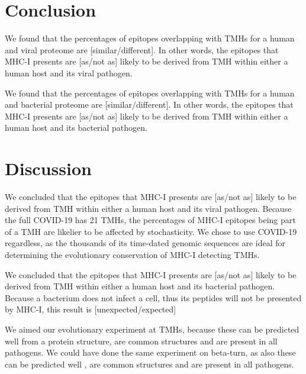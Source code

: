 \section{Conclusion}

We found that the percentages of epitopes overlapping 
with TMHs for a human and viral proteome are 
[similar/different]. In other words, the
epitopes that MHC-I presents are [as/not as] likely 
to be derived from TMH within either a human host and its viral pathogen.

We found that the percentages of epitopes overlapping 
with TMHs for a human and bacterial proteome are 
[similar/different]. In other words, the
epitopes that MHC-I presents are [as/not as] likely 
to be derived from TMH within either a human host and its bacterial pathogen.

\section{Discussion}

We concluded that the
epitopes that MHC-I presents are [as/not as] likely 
to be derived from TMH within either a human host and its viral pathogen.
Because the full COVID-19 has 21 TMHs, the percentages
of MHC-I epitopes being part of a TMH are likelier to be affected by
stochasticity. We chose to use COVID-19 regardless, as the thousands
of its time-dated genomic sequences are ideal for determining the 
evolutionary conservation of MHC-I detecting TMHs. 

We concluded that the
epitopes that MHC-I presents are [as/not as] likely 
to be derived from TMH within either a human host and its bacterial pathogen.
Because a bacterium does not infect a cell, thus its peptides
will not be presented by MHC-I, this result is [unexpected/expected]

We aimed our evolutionary experiment at TMHs, because these can
be predicted well from a protein structure,
are common structures and are present in all pathogens. 
We could have done the same experiment on beta-turn,
as also these can be predicted well \cite{petersen2010netturnp},
are common structures and are present in all pathogens.



